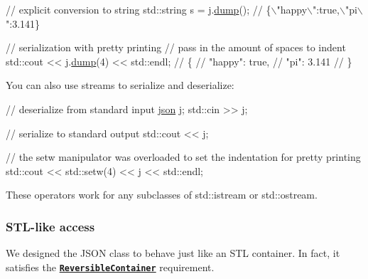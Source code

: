\begin{DoxyCode}
\textcolor{comment}{// explicit conversion to string}
std::string s = j.\hyperlink{a00025_a805e3f3a2f374da0e14942eec7400e40}{dump}();    \textcolor{comment}{// \{\(\backslash\)"happy\(\backslash\)":true,\(\backslash\)"pi\(\backslash\)":3.141\}}

\textcolor{comment}{// serialization with pretty printing}
\textcolor{comment}{// pass in the amount of spaces to indent}
std::cout << j.\hyperlink{a00025_a805e3f3a2f374da0e14942eec7400e40}{dump}(4) << std::endl;
\textcolor{comment}{// \{}
\textcolor{comment}{//     "happy": true,}
\textcolor{comment}{//     "pi": 3.141}
\textcolor{comment}{// \}}
\end{DoxyCode}


You can also use streams to serialize and deserialize\+:


\begin{DoxyCode}
\textcolor{comment}{// deserialize from standard input}
\hyperlink{a00025}{json} j;
std::cin >> j;

\textcolor{comment}{// serialize to standard output}
std::cout << j;

\textcolor{comment}{// the setw manipulator was overloaded to set the indentation for pretty printing}
std::cout << std::setw(4) << j << std::endl;
\end{DoxyCode}


These operators work for any subclasses of {\ttfamily std\+::istream} or {\ttfamily std\+::ostream}.

\subsubsection*{S\+T\+L-\/like access}

We designed the J\+S\+ON class to behave just like an S\+TL container. In fact, it satisfies the \href{http://en.cppreference.com/w/cpp/concept/ReversibleContainer}{\tt {\bfseries Reversible\+Container}} requirement.


